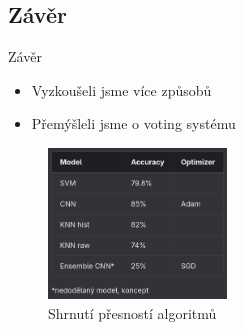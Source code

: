 \documentclass[aspectratio=169]{beamer}
\begin{document}
\subsection{Závěr}

\begin{frame}{Závěr}
    \begin{itemize}
        \item Vyzkoušeli jsme více způsobů
        \item Přemýšleli jsme o voting systému
    \end{itemize}
    \begin{figure}
        \centering
        \includegraphics[height=4cm]{table.png}
        \caption{Shrnutí přesností algoritmů}
    \end{figure}
\end{frame}
\end{document}
